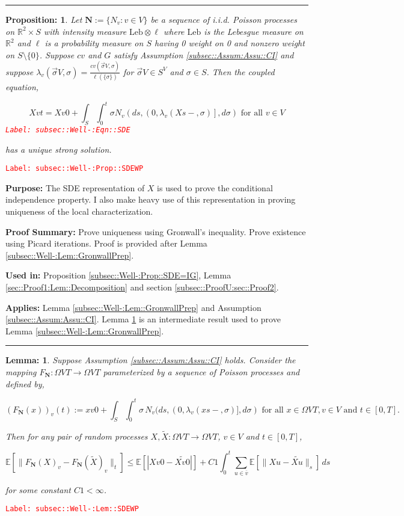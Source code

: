\documentclass[12pt]{article}
\newcommand{\mb}{\mathbb}
\newcommand{\ra}{\rightarrow}
\newcommand{\ov}{\overline}
\newcommand{\te}{\text}
\newcommand{\tr}{\textcolor{red}}
\newcommand{\labe}[1]{\tr{\texttt{Label: #1}}}
\newcommand{\purpose}{\textbf{Purpose: }}
\newcommand{\pfsum}{\textbf{Proof Summary: }}
\newcommand{\usein}{\textbf{Used in: }}
\newcommand{\app}{\textbf{Applies: }}
\newcommand{\lin}{\rule{\linewidth}{0.4 pt}}
\newcommand{\ex}[1]{\mb{E}\left[#1\right]}			%
\newcommand{\defeq}{:=}								%
\renewcommand{\v}{v}							%
\newcommand{\vv}{u}								%
\renewcommand{\S}{S}							%
\newcommand{\s}{\sigma}							%
\newcommand{\sv}{\vec{\s}}						%
\newcommand{\T}{T}								%
\newcommand{\x}{x}								%
\renewcommand{\t}{t}							%
\renewcommand{\tt}{s}							%
\newcommand{\X}{X}								%
\newcommand{\IGr}{c}							%
\newcommand{\cl}{\ov}							%
\newcommand{\const}{C}							%
\newcommand{\poiss}[1]{N_{#1}}						%
\newcommand{\poisses}{\mathbf{N}}				%
\newcommand{\leb}{\te{Leb}}							%
\newcommand{\XState}[1]{\S^{#1}}				%
\newcommand{\rate}[1]{\lambda_{#1}}					%
\newcommand{\Sm}{\ell}								%
\newcommand{\alt}{\widetilde}						%
\newtheorem{prop}[thms]{Proposition: }
\newtheorem{lem}[thms]{Lemma: }
\begin{document}
\lin

\begin{prop}
Let \(\poisses \defeq \{\poiss{\v}:\v\in  V\}\) be a sequence of i.i.d. Poisson processes on \(\mb{R}^2\times \S\) with intensity measure \(\leb\otimes \Sm\) where \(\leb\) is the Lebesgue measure on \(\mb{R}^2\) and \(\Sm\) is a probability measure on \(\S\) having 0 weight on 0 and nonzero weight on \(\S\setminus \{0\}\). Suppose \(\IGr{\v}\) and \(G\) satisfy Assumption \ref{subsec::Assum:Assu::CI} and suppose \(\rate{\v}(\sv{}{ V},\s) = \frac{\IGr{\v}(\sv{}{ V},\s)}{\Sm(\{\s\})}\) for \(\sv{}{ V} \in \S^ V\) and \(\s \in \S\). Then the coupled equation,

\begin{equation}
\X{\v}{\t} = \X{\v}{0} + \int_\S\int_0^\t \s\poiss{\v}\left(d\tt,\left(0,\rate{\v}(\X{}{\tt-},\s)\right],d\s\right) \te{ for all }\v \in  V
\label{subsec::Well-:Eqn::SDE}
\end{equation}
\labe{subsec::Well-:Eqn::SDE}

has a unique strong solution.
\label{subsec::Well-:Prop::SDEWP}
\end{prop}
\labe{subsec::Well-:Prop::SDEWP}

\purpose The SDE representation of \(\X{}{}\) is used to prove the conditional independence property. I also make heavy use of this representation in proving uniqueness of the local characterization.

\pfsum Prove uniqueness using Gronwall's inequality. Prove existence using Picard iterations. Proof is provided after Lemma \ref{subsec::Well-:Lem::GronwallPrep}.

\usein Proposition \ref{subsec::Well-:Prop::SDE=IG}, Lemma \ref{sec::Proof1:Lem::Decomposition} and section \ref{subsec::ProofU:sec::Proof2}.

\app Lemma \ref{subsec::Well-:Lem::GronwallPrep} and Assumption \ref{subsec::Assum:Assu::CI}. Lemma \ref{subsec::Well-:Lem::SDEWP} is an intermediate result used to prove Lemma \ref{subsec::Well-:Lem::GronwallPrep}.

\lin

\begin{lem}
Suppose Assumption \ref{subsec::Assum:Assu::CI} holds. Consider the mapping \(F_\poisses: \Omega{ V}{\T} \ra \Omega{ V}{\T}\) parameterized by a sequence of Poisson processes and defined by,

\[\left(F_\poisses(\x{}{})\right)_\v(\t) := \x{\v}{0} + \int_\S\int_0^\t \s \,\poiss{\v}(d\tt,(0,\rate{\v}(\x{}{\tt-},\s)],d\s) \te{ for all }\x{}{} \in \Omega{ V}{\T}, \v \in  V\te{ and }\t \in [0,\T].\]

Then for any pair of random processes \(\X{}{},\alt{\X{}{}}:\Omega{ V}{\T} \ra \Omega{ V}{\T}\), \(\v\in  V\) and \(\t \in [0,\T]\),

\[\ex{\|F_\poisses(\X{}{})_\v - F_\poisses(\alt{\X{}{}})_\v\|_\t} \leq \ex{|\X{\v}{0} - \alt{\X{\v}{0}}|} +  \const{1}\int_0^\t \sum_{\vv\in \cl{\v}} \ex{\|\X{\vv}{} - \alt{\X{\vv}{}}\|_\tt}\,d\tt\]

for some constant \(\const{1} < \infty\).

\label{subsec::Well-:Lem::SDEWP}
\end{lem}
\labe{subsec::Well-:Lem::SDEWP}
\end{document}
